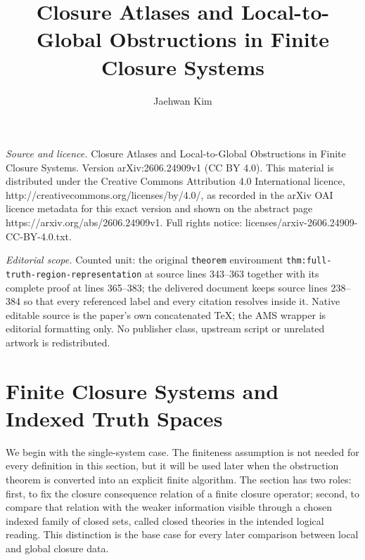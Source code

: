 \documentclass[10pt,a4paper]{amsart}
\numberwithin{equation}{section}
\begin{document}
\title[Closure Atlases and Local-to-Global Obstructions in Finite C]{Closure Atlases and Local-to-Global Obstructions in Finite Closure Systems}
\author{Jaehwan Kim}
\date{}
\maketitle
\noindent\emph{Source and licence.} Closure Atlases and Local-to-Global Obstructions in Finite Closure Systems. Version arXiv:2606.24909v1 (CC BY 4.0). This material is distributed under the Creative Commons Attribution 4.0 International licence, http://creativecommons.org/licenses/by/4.0/, as recorded in the arXiv OAI licence metadata for this exact version and shown on the abstract page https://arxiv.org/abs/2606.24909v1. Full rights notice: licenses/arxiv-2606.24909-CC-BY-4.0.txt.\par\smallskip
\noindent\textit{Editorial scope.} Counted unit: the original \texttt{theorem} environment \texttt{thm:full-truth-region-representation} at source lines 343--363 together with its complete proof at lines 365--383; the delivered document keeps source lines 238--384 so that every referenced label and every citation resolves inside it. Native editable source is the paper's own concatenated TeX; the AMS wrapper is editorial formatting only. No publisher class, upstream script or unrelated artwork is redistributed.
\section{Finite Closure Systems and Indexed Truth Spaces}
\label{sec:finite-closure-systems}

We begin with the single-system case.  The finiteness assumption is not needed for every definition in this section, but it will be used later when the obstruction theorem is converted into an explicit finite algorithm.  The section has two roles: first, to fix the closure consequence relation of a finite closure operator; second, to compare that relation with the weaker information visible through a chosen indexed family of closed sets, called closed theories in the intended logical reading.  This distinction is the base case for every later comparison between local and global closure data.
\end{document}
